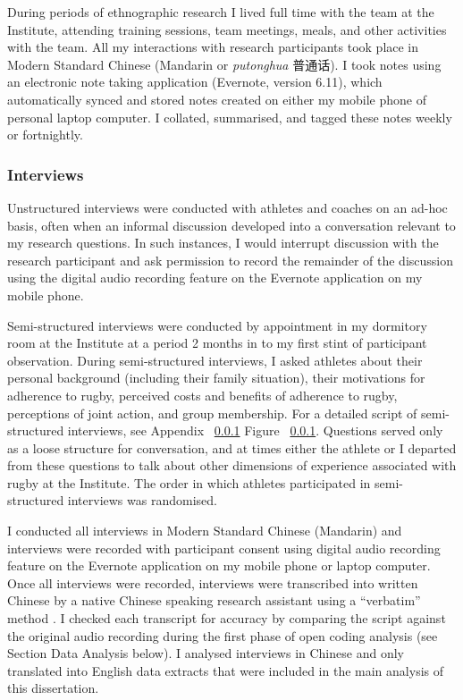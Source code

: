   During periods of ethnographic research I lived full time with the team at the Institute, attending training sessions, team meetings, meals, and other activities with the team.   All my interactions with research participants took place in Modern Standard Chinese (Mandarin or \textit{putonghua} 普通话).  I took notes using an electronic note taking application (Evernote, version 6.11), which automatically synced and stored notes created on either my mobile phone of personal laptop computer. I collated, summarised, and tagged these notes weekly or fortnightly.


    \subsubsection{Interviews}

  Unstructured interviews were conducted with athletes and coaches on an ad-hoc basis, often when an informal discussion developed into a conversation relevant to my research questions. In such instances, I would interrupt discussion with the research participant and ask permission to record the remainder of the discussion using the digital audio recording feature on the Evernote application on my mobile phone.

  Semi-structured interviews were conducted by appointment in my dormitory room at the Institute at a period 2 months in to my first stint of participant observation.  During semi-structured interviews, I asked athletes about their personal background (including their family situation), their motivations for adherence to rugby, perceived costs and benefits of adherence to rugby, perceptions of joint action, and group membership. For a detailed script of semi-structured interviews, see Appendix ~\ref{} Figure ~\ref{}.  Questions served only as a loose structure for conversation, and at times either the athlete or I departed from these questions to talk about other dimensions of experience associated with rugby at the Institute.  The order in which athletes participated in semi-structured interviews was randomised.

  I conducted all interviews in Modern Standard Chinese (Mandarin) and interviews were recorded with participant consent using digital audio recording feature on the Evernote application on my mobile phone or laptop computer.  Once all interviews were recorded, interviews were transcribed into written Chinese by a native Chinese speaking research assistant using a ``verbatim'' method \citep[i.e., including an account of all verbal and important nonverbal (coughs, pauses, etc.) utterances, see][269-70]{Poland2003}.  I checked each transcript for accuracy by comparing the script against the original audio recording during the first phase of open coding analysis (see Section Data Analysis below). I analysed interviews in Chinese and only translated into English data extracts that were included in the main analysis of this dissertation.

